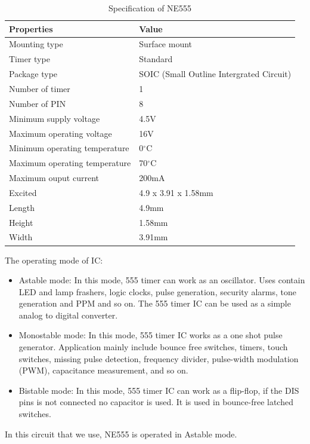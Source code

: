 \documentclass[a4paper]{report}
\begin{document}
        \begin{table}[ht]
            \centering
            \begin{tabular}{ | l | l | }
                \hline
                Properties & Value \\ \hline
                Mounting type & Surface mount \\ \hline
                Timer type & Standard \\ \hline
                Package type & SOIC (Small Outline Intergrated Circuit) \\ \hline
                Number of timer & 1 \\ \hline
                Number of PIN & 8 \\ \hline
                Minimum supply voltage & 4.5V \\ \hline
                Maximum operating voltage & 16V \\ \hline
                Minimum operating temperature & 0$^{\circ}$C \\ \hline
                Maximum operating temperature & 70$^{\circ}$C \\ \hline
                Maximum ouput current & 200mA \\ \hline
                Excited & 4.9 x 3.91 x 1.58mm \\ \hline
                Length & 4.9mm \\ \hline
                Height & 1.58mm \\ \hline
                Width & 3.91mm \\ 
                \hline
            \end{tabular}
            \caption{\label{tab:fith}Specification of NE555}
        \end{table}
        \par The operating mode of IC:
        \begin{itemize}
            \item Astable mode: In this mode, 555 timer can work as an oscillator. Uses contain LED 
            and lamp frashers, logic clocks, pulse generation, security alarms, tone generation 
            and PPM and so on. The 555 timer IC can be used as a simple analog to digital converter. 
            \item Monostable mode: In this mode, 555 timer IC works as a one shot pulse generator. 
            Application mainly include bounce free switches, timers, touch switches, missing pulse 
            detection, frequency divider, pulse-width modulation (PWM), capacitance measurement, and so on.
            \item Bistable mode: In this mode, 555 timer IC can work as a flip-flop, if the DIS pins 
            is not connected no capacitor is used. It is used in bounce-free latched switches.
        \end{itemize}
        \par In this circuit that we use, NE555 is operated in Astable mode.
\end{document}
